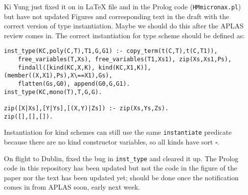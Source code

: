 \documentclass[runningheads,a4paper]{llncs}
\begin{document}
Ki Yung just fixed it on in LaTeX file and in the Prolog code
(\verb|HMmicronax.pl|) but have not updated Figures and corresponding text
in the draft with the correct version of type instantiation. Maybe we should
do this after the APLAS review comes in.
The correct instantiation for type scheme should be defined as:
\begin{verbatim}
inst_type(KC,poly(C,T),T1,G,G1) :- copy_term(t(C,T),t(C,T1)),
    free_variables(T,Xs), free_variables(T1,Xs1), zip(Xs,Xs1,Ps),
    findall([kind(KC,X,K), kind(KC,X1,K)],(member((X,X1),Ps),X\==X1),Gs),
    flatten(Gs,G0), append(G0,G,G1).
inst_type(KC,mono(T),T,G,G).

zip([X|Xs],[Y|Ys],[(X,Y)|Zs]) :- zip(Xs,Ys,Zs).
zip([],[],[]).
\end{verbatim}
Instantiation for kind schemes can still use the same \verb|instantiate|
predicate because there are no kind constructor variables, so  all kinds
have sort $\square$.

On flight to Dublin, fixed the bug in \verb|inst_type| and cleared it up.
The Prolog code in this repository has been updated but not the code
in the figure of the paper nor the text has been updated yet;
should be done once the notification comes in from APLAS soon,
early next week.
\end{document}
